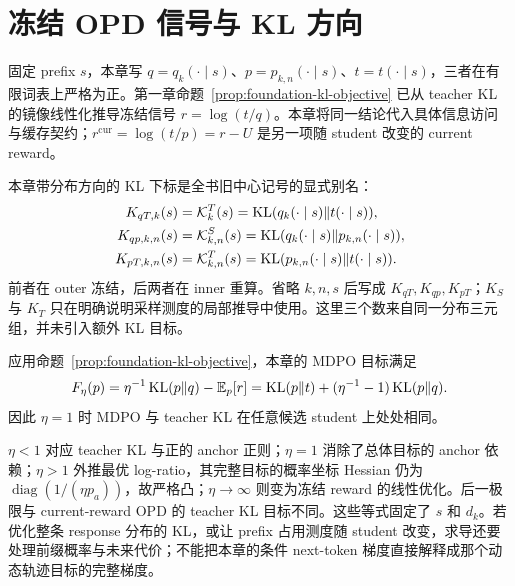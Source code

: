 \section{冻结 OPD 信号与 KL 方向}
\label{opd:mirror-origin}

固定 prefix $s$，本章写 $q=q_k(\cdot\mid s)$、$p=p_{k,n}(\cdot\mid s)$、$t=t(\cdot\mid s)$，三者在有限词表上严格为正。第一章命题~\ref{prop:foundation-kl-objective} 已从 teacher KL 的镜像线性化推导冻结信号 $r=\log(t/q)$。本章将同一结论代入具体信息访问与缓存契约；$r^{\mathrm{cur}}=\log(t/p)=r-U$ 是另一项随 student 改变的 current reward。

本章带分布方向的 KL 下标是全书旧中心记号的显式别名：
\begin{align}
K_{qT,k}(s)&=\mathcal K_k^T(s)=\operatorname{KL}(q_k(\cdot\mid s)\Vert t(\cdot\mid s)),\\
K_{qp,k,n}(s)&=\mathcal K_{k,n}^S(s)=\operatorname{KL}(q_k(\cdot\mid s)\Vert p_{k,n}(\cdot\mid s)),\\
K_{pT,k,n}(s)&=\mathcal K_{k,n}^T(s)=\operatorname{KL}(p_{k,n}(\cdot\mid s)\Vert t(\cdot\mid s)).
\end{align}
前者在 outer 冻结，后两者在 inner 重算。省略 $k,n,s$ 后写成 $K_{qT},K_{qp},K_{pT}$；$K_S$ 与 $K_T$ 只在明确说明采样测度的局部推导中使用。这里三个数来自同一分布三元组，并未引入额外 KL 目标。

\begin{corollary}
\label{opd:objective-family}
应用命题~\ref{prop:foundation-kl-objective}，本章的 MDPO 目标满足
\begin{equation}
F_\eta(p)=\eta^{-1}\operatorname{KL}(p\Vert q)-\mathbb E_p[r]
=\operatorname{KL}(p\Vert t)+(\eta^{-1}-1)\operatorname{KL}(p\Vert q).
\end{equation}
因此 $\eta=1$ 时 MDPO 与 teacher KL 在任意候选 student 上处处相同。
\end{corollary}

$\eta<1$ 对应 teacher KL 与正的 anchor 正则；$\eta=1$ 消除了总体目标的 anchor 依赖；$\eta>1$ 外推最优 log-ratio，其完整目标的概率坐标 Hessian 仍为 $\operatorname{diag}(1/(\eta p_a))$，故严格凸；$\eta\to\infty$ 则变为冻结 reward 的线性优化。后一极限与 current-reward OPD 的 teacher KL 目标不同。这些等式固定了 $s$ 和 $d_k$。若优化整条 response 分布的 KL，或让 prefix 占用测度随 student 改变，求导还要处理前缀概率与未来代价；不能把本章的条件 next-token 梯度直接解释成那个动态轨迹目标的完整梯度。


